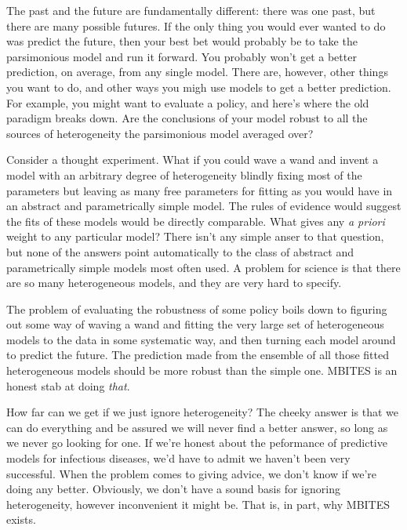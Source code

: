 \documentclass{article}
\begin{document}
The past and the future are fundamentally different: there was one past, but there are many possible futures.  If the only thing you would ever wanted to do was predict the future, then your best bet would probably be to take the parsimonious model and run it forward. You probably won't get a better prediction, on average, from any single model. There are, however, other things you want to do, and other ways you migh use models to get a better prediction. For example, you might want to evaluate a policy, and here's where the old paradigm breaks down. Are the conclusions of your model robust to all the sources of heterogeneity the parsimonious model averaged over?

Consider a thought experiment. What if you could wave a wand and invent a model with an arbitrary degree of heterogeneity blindly fixing most of the parameters but leaving as many free parameters for fitting as you would have in an abstract and parametrically simple model. The rules of evidence would suggest the fits of these  models would be directly comparable. What gives any {\em a priori} weight to any particular model? There isn't any simple anser to that question, but none of the answers point automatically to the class of abstract and parametrically simple models most often used. A problem for science is that there are so many heterogeneous models, and they are very hard to specify. 

The problem of evaluating the robustness of some policy boils down to figuring out some way of waving a wand and fitting the very large set of heterogeneous models to the data in some systematic way, and then turning each model around to predict the future. The prediction made from the ensemble of all those fitted heterogeneous models should be more robust than the simple one. MBITES is an honest stab at doing {\em that}. 

How far can we get if we just ignore heterogeneity? The cheeky answer is that we can do everything and be assured we will never find a better answer, so long as we never go looking for one. If we're honest about the peformance of predictive models for infectious diseases, we'd have to admit we haven't been very successful. When the problem comes to giving advice, we don't know if we're doing any better.  Obviously, we don't have a sound basis for ignoring heterogeneity, however inconvenient it might be. That is, in part, why MBITES exists. 
\end{document}
